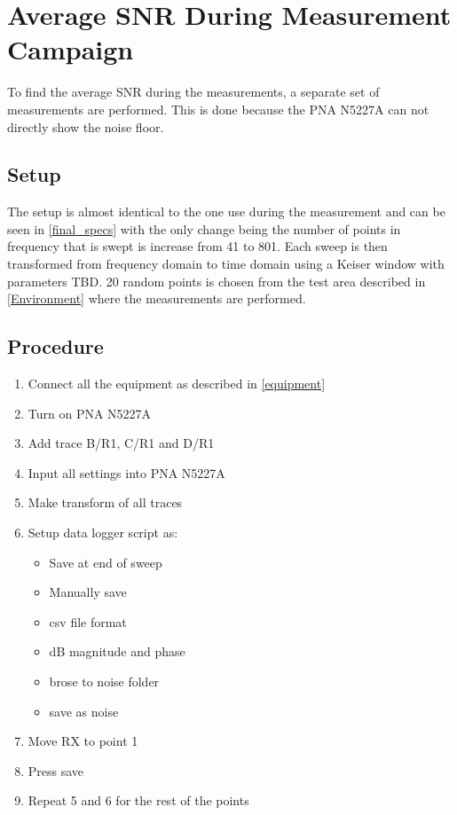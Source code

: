 \section{Average SNR During Measurement Campaign}
\label{app:SNR}

To find the average SNR during the measurements, a separate set of measurements are performed. This is done because the PNA N5227A can not directly show the noise floor. 

\subsection{Setup}
The setup is almost identical to the one use during the measurement and can be seen in \autoref{final_specs} with the only change being the number of points in frequency that is swept is increase from 41 to 801. Each sweep is then transformed from frequency domain to time domain using a Keiser window with parameters TBD. 20 random points is chosen from the test area described in \autoref{Environment} where the measurements are performed. 

\subsection{Procedure}
\begin{enumerate}
	\item Connect all the equipment as described in \autoref{equipment}
	\item Turn on PNA N5227A
	\item Add trace B/R1, C/R1 and D/R1  
	\item Input all settings into PNA N5227A
	\item Make transform of all traces
	\item Setup data logger script as:
	\begin{itemize}
		\item Save at end of sweep
		\item Manually save
		\item csv file format
		\item dB magnitude and phase
		\item brose to noise folder
		\item save as noise
	\end{itemize}
	\item Move RX to point 1
	\item Press save
	\item Repeat 5 and 6 for the rest of the points	
\end{enumerate}


